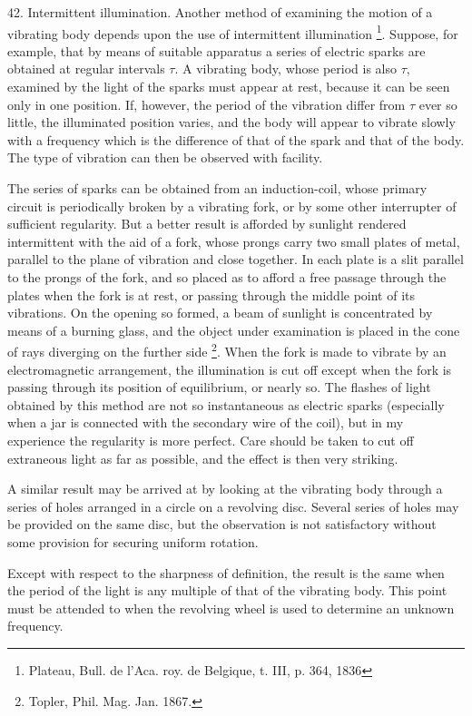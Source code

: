 42. Intermittent illumination.  Another method of examining the motion of a
vibrating body depends upon the use of intermittent illumination
\footnote{Plateau, Bull. de l'Aca. roy. de Belgique, t. III, p. 364, 1836}.
Suppose, for example, that by means of suitable apparatus a series of electric
sparks are obtained at regular intervals \(\tau\).  A vibrating body, whose
period is also \(\tau\), examined by the light of the sparks must appear at
rest, because it can be seen only in one position. If, however, the period of
the vibration differ from \(\tau\) ever so little, the illuminated position
varies, and the body will appear to vibrate slowly with a frequency which is
the difference of that of the spark and that of the body. The type of vibration
can then be observed with facility.

The series of sparks can be obtained from an induction-coil, whose primary
circuit is periodically broken by a vibrating fork, or by some other
interrupter of sufficient regularity. But a better result is afforded by
sunlight rendered intermittent with the aid of a fork, whose prongs carry two
small plates of metal, parallel to the plane of vibration and close together.
In each plate is a slit parallel to the prongs of the fork, and so placed as to
afford a free passage through the plates when the fork is at rest, or passing
through the middle point of its vibrations. On the opening so formed, a beam of
sunlight is concentrated by means of a burning glass, and the object under
examination is placed in the cone of rays diverging on the further side
\footnote{Topler, Phil. Mag. Jan. 1867.}.  When the fork is made to vibrate by
an electromagnetic arrangement, the illumination is cut off except when the
fork is passing through its position of equilibrium, or nearly so. The flashes
of light obtained by this method are not so instantaneous as electric sparks
(especially when a jar is connected with the secondary wire of the coil), but
in my experience the regularity is more perfect. Care should be taken to cut
off extraneous light as far as possible, and the effect is then very striking.

A similar result may be arrived at by looking at the vibrating body through a
series of holes arranged in a circle on a revolving disc.  Several series of
holes may be provided on the same disc, but the observation is not satisfactory
without some provision for securing uniform rotation.

Except with respect to the sharpness of definition, the result is the same when
the period of the light is any multiple of that of the vibrating body. This
point must be attended to when the revolving wheel is used to determine an
unknown frequency.

